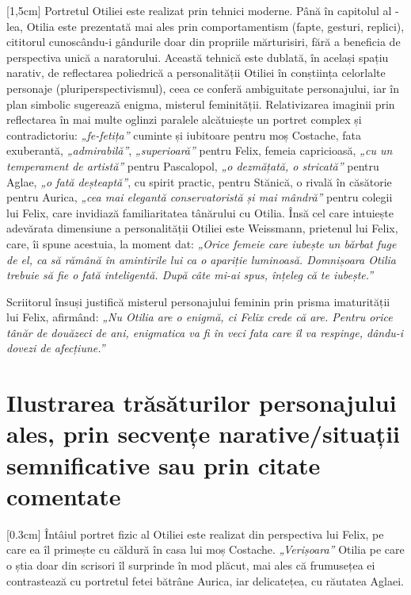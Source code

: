 [1,5cm]
Portretul Otiliei este realizat prin tehnici moderne. Până în capitolul al -lea, Otilia este prezentată mai ales prin comportamentism (fapte, gesturi, replici), cititorul cunoscându-i gândurile doar din propriile mărturisiri, fără a beneficia de perspectiva unică a naratorului. Această tehnică este dublată, în același spațiu narativ, de reflectarea poliedrică a personalității Otiliei în conștiința celorlalte personaje (pluriperspectivismul), ceea ce conferă ambiguitate personajului, iar în plan simbolic sugerează enigma, misterul feminității. Relativizarea imaginii prin reflectarea în mai multe oglinzi paralele alcătuiește un portret complex și contradictoriu: \textit{„fe-fetița”} cuminte și iubitoare pentru moș Costache, fata exuberantă, \textit{„admirabilă”}, \textit{„superioară”} pentru Felix, femeia capricioasă, \textit{„cu un temperament de artistă”} pentru Pascalopol, \textit{„o dezmățată, o stricată”} pentru Aglae, \textit{„o fată deșteaptă”}, cu spirit practic, pentru Stănică, o rivală în căsătorie pentru Aurica, \textit{„cea mai elegantă conservatoristă și mai mândră”} pentru colegii lui Felix, care invidiază familiaritatea tânărului cu Otilia. Însă cel care intuiește adevărata dimensiune a personalității Otiliei este Weissmann, prietenul lui Felix, care, îi spune acestuia, la moment dat: \textit{„Orice femeie care iubește un bărbat fuge de el, ca să rămână în amintirile lui ca o apariție luminoasă. Domnișoara Otilia trebuie să fie o fată inteligentă. După câte mi-ai spus, înțeleg că te iubește.”}

Scriitorul însuși justifică misterul personajului feminin prin prisma imaturității lui Felix, afirmând: \textit{„Nu Otilia are o enigmă, ci Felix crede că are. Pentru orice tânăr de douăzeci de ani, enigmatica va fi în veci fata care îl va respinge, dându-i dovezi de afecțiune.”}


\section{Ilustrarea trăsăturilor personajului ales, prin secvențe narative/situații semnificative sau prin citate comentate}

[0.3cm]
Întâiul portret fizic al Otiliei este realizat din perspectiva lui Felix, pe care ea îl primește cu căldură în casa lui moș Costache. \textit{„Verișoara”} Otilia pe care o știa doar din scrisori îl surprinde în mod plăcut, mai ales că frumusețea ei contrastează cu portretul fetei bătrâne Aurica, iar delicatețea, cu răutatea Aglaei.

